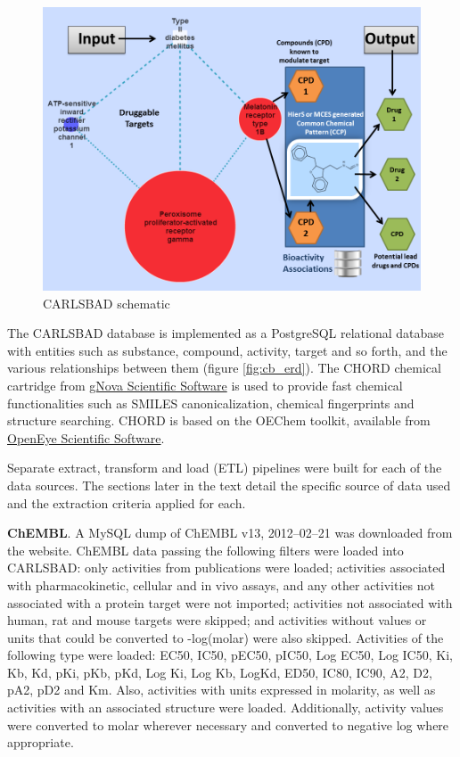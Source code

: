 \begin{figure}
    \centering
    \includegraphics[width=\textwidth]{figures/carlsbad/CB1_Screenshots.png}
    \caption{CARLSBAD schematic}
    \label{fig:cb_schematic}
\end{figure}

The CARLSBAD database is implemented as a PostgreSQL relational database with entities such as substance, compound, activity, target and so forth, and the various relationships between them (figure \ref{fig:cb_erd}). The CHORD chemical cartridge from \href{https://www.gnova.com/}{gNova Scientific Software} is used to provide fast chemical functionalities such as SMILES canonicalization\cite{Weininger1989-kh}, chemical fingerprints and structure searching. CHORD is based on the OEChem toolkit, available from \href{https://www.eyesopen.com/}{OpenEye Scientific Software}.


Separate extract, transform and load (ETL) pipelines were built for each of the data sources. The sections later in the text detail the specific source of data used and the extraction criteria applied for each.

\textbf{ChEMBL}. A MySQL dump of ChEMBL v13, 2012–02–21 was downloaded from the website. ChEMBL data passing the following filters were loaded into CARLSBAD: only activities from publications were loaded; activities associated with pharmacokinetic, cellular and in vivo assays, and any other activities not associated with a protein target were not imported; activities not associated with human, rat and mouse targets were skipped; and activities without values or units that could be converted to -log(molar) were also skipped. Activities of the following type were loaded: EC50, IC50, pEC50, pIC50, Log EC50, Log IC50, Ki, Kb, Kd, pKi, pKb, pKd, Log Ki, Log Kb, LogKd, ED50, IC80, IC90, A2, D2, pA2, pD2 and Km. Also, activities with units expressed in molarity, as well as activities with an associated structure were loaded. Additionally, activity values were converted to molar wherever necessary and converted to negative log where appropriate.

